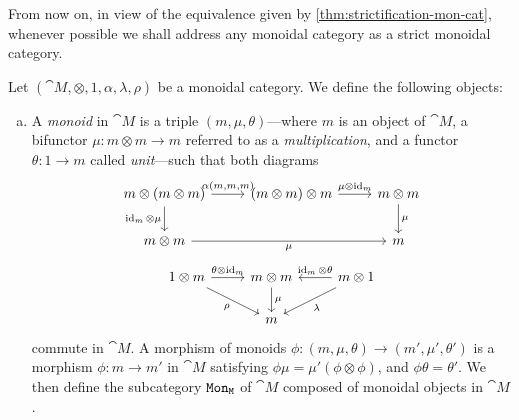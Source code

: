 \documentclass[../../deep-dive]{subfiles}
\begin{document}
From now on, in view of the equivalence given by
\cref{thm:strictification-mon-cat}, whenever possible we shall address any
monoidal category as a strict monoidal category.

\begin{definition}
    \label{def:(co)monoids}
    Let \((\cat M, \otimes, 1, \alpha, \lambda, \rho)\) be a monoidal category. We
    define the following objects:
    \begin{enumerate}[(a)]\setlength\itemsep{0em}
        \item A \emph{monoid} in \(\cat M\) is a triple \((m, \mu, \theta)\)---where
              \(m\) is an object of \(\cat M\), a bifunctor \(\mu: m \otimes m \to m\)
              referred to as a \emph{multiplication}, and a functor \(\theta: 1 \to m\)
              called \emph{unit}---such that both diagrams
              \[
                  \begin{tikzcd}
                      m \otimes (m \otimes m) \ar[d, "\Id_m \otimes \mu"']
                      \ar[r, "{\alpha(m, m, m)}"]
                      &(m \otimes m) \otimes m
                      \ar[r, "\mu \otimes \Id_m"]
                      &m \otimes m \ar[d, "\mu"] \\
                      m \otimes m \ar[rr, "\mu"']
                      &&m
                  \end{tikzcd}
              \]
              \[
                  \begin{tikzcd}
                      1 \otimes m \ar[r, "\theta \otimes \Id_m"]
                      \ar[rd, "\rho"']
                      & m \otimes m \ar[d, "\mu"]
                      &m \otimes 1
                      \ar[l, "\Id_m \otimes \theta"']
                      \ar[ld, "\lambda"] \\
                      &m &
                  \end{tikzcd}
              \]
              commute in \(\cat M\). A morphism of monoids
              \(\phi: (m, \mu, \theta) \to (m', \mu', \theta')\) is a morphism
              \(\phi: m \to m'\) in \(\cat M\) satisfying
              \(\phi \mu = \mu'(\phi \otimes \phi)\), and \(\phi \theta = \theta'\). We then
              define the subcategory \({\texttt{Mon}}_{\texttt M}\) of \(\cat M\) composed of monoidal
              objects in \(\cat M\).


\end{enumerate}
\end{definition}
\end{document}
